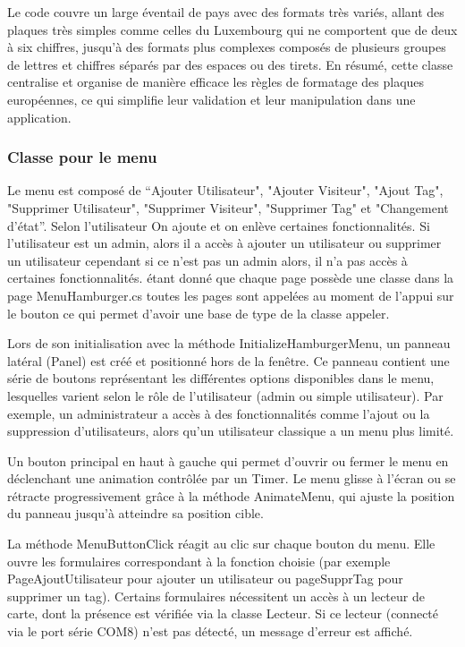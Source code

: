 \documentclass[main.tex]{subfiles}
\begin{document}
Le code couvre un large éventail de pays avec des formats très variés, allant des plaques très simples comme celles du Luxembourg qui ne comportent que de deux à six chiffres, jusqu’à des formats plus complexes composés de plusieurs groupes de lettres et chiffres séparés par des espaces ou des tirets. En résumé, cette classe centralise et organise de manière efficace les règles de formatage des plaques européennes, ce qui simplifie leur validation et leur manipulation dans une application. 

\subsubsection{Classe pour le menu}

Le menu est composé de  “Ajouter Utilisateur", "Ajouter Visiteur", "Ajout Tag", "Supprimer Utilisateur", "Supprimer Visiteur", "Supprimer Tag" et "Changement d'état”. Selon l'utilisateur On ajoute et on enlève certaines fonctionnalités. Si l'utilisateur est un admin, alors il a accès à ajouter un utilisateur ou supprimer un utilisateur cependant si ce n'est pas un admin alors, il n'a pas accès à certaines fonctionnalités. étant donné que chaque page possède une classe dans la page MenuHamburger.cs toutes les pages sont appelées au moment de l'appui sur le bouton ce qui permet d'avoir une base de type de la classe appeler. 

Lors de son initialisation avec la méthode InitializeHamburgerMenu, un panneau latéral (Panel) est créé et positionné hors de la fenêtre. Ce panneau contient une série de boutons représentant les différentes options disponibles dans le menu, lesquelles varient selon le rôle de l’utilisateur (admin ou simple utilisateur). Par exemple, un administrateur a accès à des fonctionnalités comme l’ajout ou la suppression d’utilisateurs, alors qu’un utilisateur classique a un menu plus limité. 

Un bouton principal en haut à gauche qui permet d’ouvrir ou fermer le menu en déclenchant une animation contrôlée par un Timer. Le menu glisse à l’écran ou se rétracte progressivement grâce à la méthode AnimateMenu, qui ajuste la position du panneau jusqu’à atteindre sa position cible. 

La méthode MenuButtonClick réagit au clic sur chaque bouton du menu. Elle ouvre les formulaires correspondant à la fonction choisie (par exemple PageAjoutUtilisateur pour ajouter un utilisateur ou pageSupprTag pour supprimer un tag). Certains formulaires nécessitent un accès à un lecteur de carte, dont la présence est vérifiée via la classe Lecteur. Si ce lecteur (connecté via le port série COM8) n’est pas détecté, un message d’erreur est affiché. 
\end{document}
